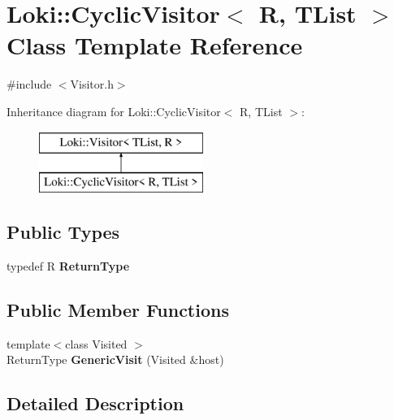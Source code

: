 \hypertarget{classLoki_1_1CyclicVisitor}{}\section{Loki\+:\+:Cyclic\+Visitor$<$ R, T\+List $>$ Class Template Reference}
\label{classLoki_1_1CyclicVisitor}


{\ttfamily \#include $<$Visitor.\+h$>$}

Inheritance diagram for Loki\+:\+:Cyclic\+Visitor$<$ R, T\+List $>$\+:\begin{figure}[H]
\begin{center}
\leavevmode
\includegraphics[height=2.000000cm]{classLoki_1_1CyclicVisitor}
\end{center}
\end{figure}
\subsection*{Public Types}
\begin{DoxyCompactItemize}
\item 
\hypertarget{classLoki_1_1CyclicVisitor_a3b4cccbfc2ce1d63def5630c3076c33a}{}typedef R {\bfseries Return\+Type}\label{classLoki_1_1CyclicVisitor_a3b4cccbfc2ce1d63def5630c3076c33a}

\end{DoxyCompactItemize}
\subsection*{Public Member Functions}
\begin{DoxyCompactItemize}
\item 
\hypertarget{classLoki_1_1CyclicVisitor_a8c9aba4414bd9c92b966e02416433497}{}{\footnotesize template$<$class Visited $>$ }\\Return\+Type {\bfseries Generic\+Visit} (Visited \&host)\label{classLoki_1_1CyclicVisitor_a8c9aba4414bd9c92b966e02416433497}

\end{DoxyCompactItemize}


\subsection{Detailed Description}
